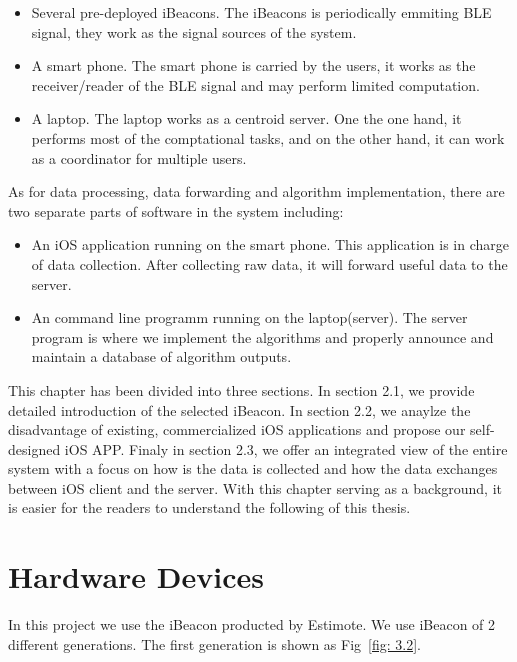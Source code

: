 \documentclass[12pt]{report}
\begin{document}
\begin{itemize}
\item Several pre-deployed iBeacons. The iBeacons is periodically emmiting BLE signal, they work as the signal sources of the system.
\item A smart phone. The smart phone is carried by the users, it works as the receiver/reader of the BLE signal and may perform limited computation.
\item A laptop. The laptop works as a centroid server. One the one hand, it performs most of the comptational tasks, and on the other hand, it can work as a coordinator for multiple users.
\end{itemize}

As for data processing, data forwarding and algorithm implementation, there are two separate parts of software in the system including:

\begin{itemize}
\item An iOS application running on the smart phone. This application is in charge of data collection. After collecting raw data, it will forward useful data to the server.
\item An command line programm running on the laptop(server). The server program is where we implement the algorithms and properly announce and maintain a database of algorithm outputs.  
\end{itemize}

This chapter has been divided into three sections. In section 2.1, we provide detailed introduction of the selected iBeacon. In section 2.2, we anaylze the disadvantage of existing, commercialized iOS applications and propose our self-designed iOS APP. Finaly in section 2.3, we offer an integrated view of the entire system with a focus on how is the data is collected and how the data exchanges between iOS client and the server. With this chapter serving as a background, it is easier for the readers to understand the following of this thesis.


\section{Hardware Devices}
In this project we use the iBeacon producted by Estimote. We use iBeacon of 2 different generations. The first generation is shown as Fig~\ref{fig: 3.2}.
\end{document}
